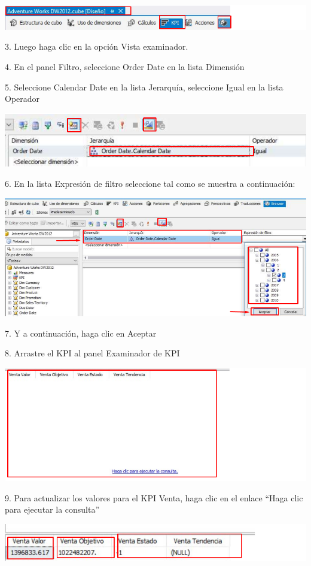 	\begin{center}
	\includegraphics[width=\columnwidth]{images/task8/img10}
	\end{center}	

3. Luego haga clic en la opción Vista examinador.

4. En el panel Filtro, seleccione Order Date en la lista Dimensión

5. Seleccione Calendar Date en la lista Jerarquía, seleccione Igual en la lista Operador

	\begin{center}
	\includegraphics[width=\columnwidth]{images/task8/img11}
	\end{center}	

6. En la lista Expresión de filtro seleccione tal como se muestra a continuación:

	\begin{center}
	\includegraphics[width=\columnwidth]{images/task8/img12}
	\end{center}	

7. Y a continuación, haga clic en Aceptar

8. Arrastre el KPI al panel Examinador de KPI

	\begin{center}
	\includegraphics[width=\columnwidth]{images/task8/img13}
	\end{center}	

9. Para actualizar los valores para el KPI Venta, haga clic en el enlace “Haga clic para ejecutar la consulta”


	\begin{center}
	\includegraphics[width=\columnwidth]{images/task8/img14}
	\end{center}	